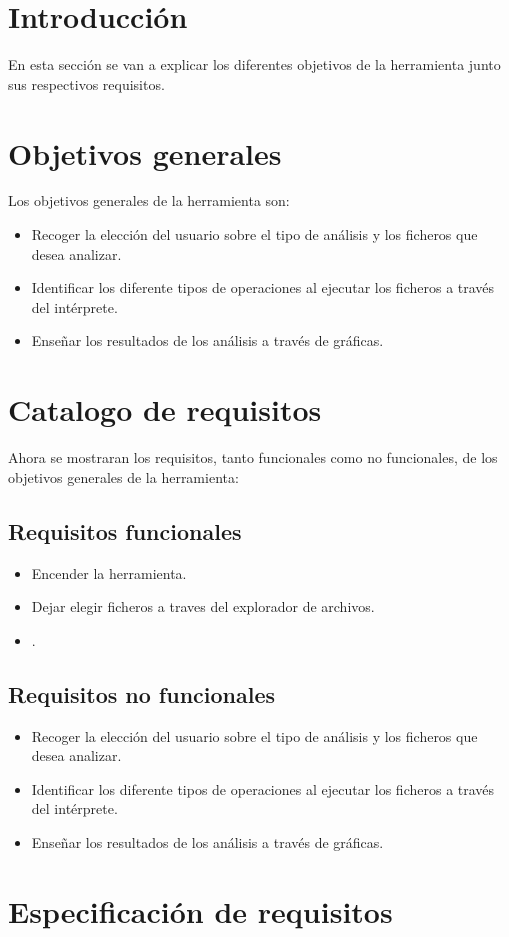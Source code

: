 
\section{Introducción}
En esta sección se van a explicar los diferentes objetivos de la herramienta junto sus respectivos requisitos.

\section{Objetivos generales}
Los objetivos generales de la herramienta son:

\begin{itemize}
	\item Recoger la elección del usuario sobre el tipo de análisis y los  ficheros que desea analizar.
	\item Identificar los diferente tipos de operaciones al ejecutar los ficheros a través del intérprete. 
	\item Enseñar los resultados  de los análisis a través de gráficas.
\end{itemize}

\section{Catalogo de requisitos}
Ahora se mostraran los requisitos, tanto funcionales como no funcionales, de los objetivos generales de la herramienta:

\subsection{Requisitos funcionales}
\begin{itemize}
	\item Encender la herramienta.
	\item Dejar elegir ficheros  a traves del explorador de archivos. 
	\item .
\end{itemize}
\subsection{Requisitos no funcionales}
\begin{itemize}
	\item Recoger la elección del usuario sobre el tipo de análisis y los  ficheros que desea analizar.
	\item Identificar los diferente tipos de operaciones al ejecutar los ficheros a través del intérprete. 
	\item Enseñar los resultados  de los análisis a través de gráficas.
\end{itemize}
\section{Especificación de requisitos}


